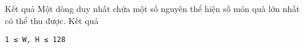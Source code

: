 Kết quả  
Một dòng duy nhất chứa một số nguyên thể hiện số món quà lớn nhất có thể thu được.
   Kết quả  
\begin{verbatim}
1 ≤ W, H ≤ 128
\end{verbatim}